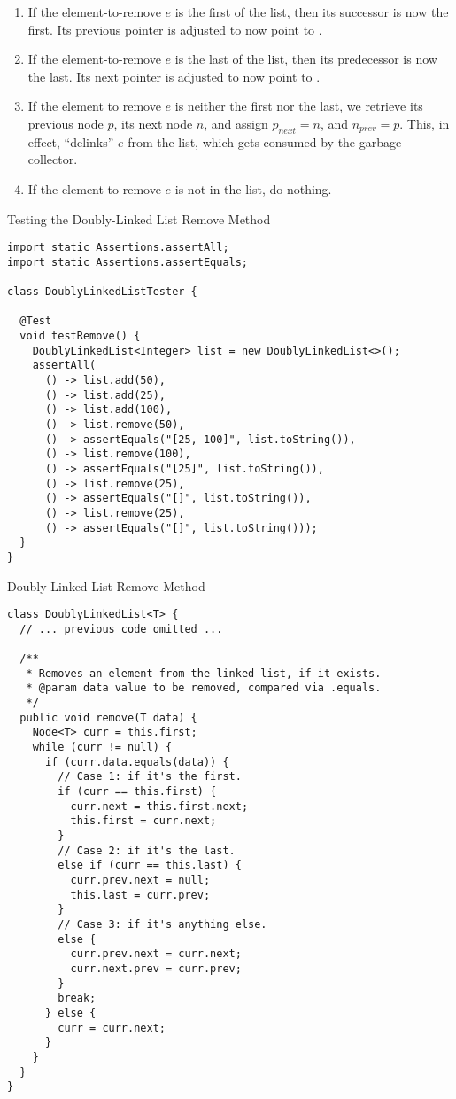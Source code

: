 \begin{enumerate}[label=(\alph*)]
  \item If the element-to-remove $e$ is the first of the list, then its successor is now the first. Its previous pointer is adjusted to now point to .
  \item If the element-to-remove $e$ is the last of the list, then its predecessor is now the last. Its next pointer is adjusted to now point to .
  \item If the element to remove $e$ is neither the first nor the last, we retrieve its previous node $p$, its next node $n$, and assign $p_\textit{next} = n$, and $n_\textit{prev} = p$. This, in effect, ``delinks'' $e$ from the list, which gets consumed by the garbage collector.
  \item If the element-to-remove $e$ is not in the list, do nothing.
\end{enumerate}

\begin{cl}[]{Testing the Doubly-Linked List Remove Method}
\begin{lstlisting}[language=MyJava]
import static Assertions.assertAll;
import static Assertions.assertEquals;

class DoublyLinkedListTester {

  @Test
  void testRemove() {
    DoublyLinkedList<Integer> list = new DoublyLinkedList<>();
    assertAll(
      () -> list.add(50),
      () -> list.add(25),
      () -> list.add(100),
      () -> list.remove(50),
      () -> assertEquals("[25, 100]", list.toString()),
      () -> list.remove(100),
      () -> assertEquals("[25]", list.toString()),
      () -> list.remove(25),
      () -> assertEquals("[]", list.toString()),
      () -> list.remove(25),
      () -> assertEquals("[]", list.toString()));
  }
}
\end{lstlisting}
\end{cl}

\begin{cl}[]{Doubly-Linked List Remove Method}
\begin{lstlisting}[language=MyJava]
class DoublyLinkedList<T> {
  // ... previous code omitted ...

  /**
   * Removes an element from the linked list, if it exists.
   * @param data value to be removed, compared via .equals.
   */
  public void remove(T data) {
    Node<T> curr = this.first;
    while (curr != null) {
      if (curr.data.equals(data)) {
        // Case 1: if it's the first.
        if (curr == this.first) {
          curr.next = this.first.next;
          this.first = curr.next;
        }
        // Case 2: if it's the last.
        else if (curr == this.last) {
          curr.prev.next = null;
          this.last = curr.prev;
        }
        // Case 3: if it's anything else.
        else {
          curr.prev.next = curr.next;
          curr.next.prev = curr.prev;
        }
        break;
      } else {
        curr = curr.next;
      }
    }
  }
}
\end{lstlisting}
\end{cl}

